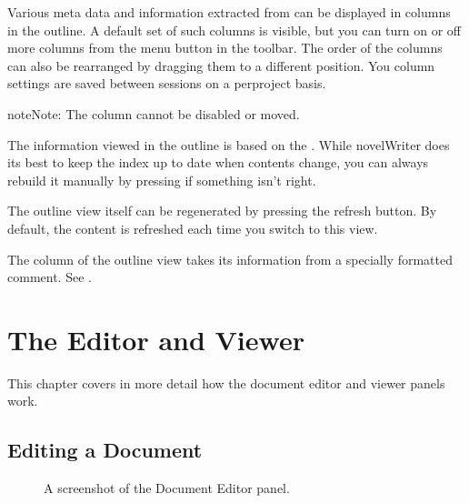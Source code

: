 \documentclass[a4paper,11pt,english]{sphinxmanual}
\begin{document}
\sphinxAtStartPar
Various meta data and information extracted from {\hyperref[\detokenize{int_glossary:term-Tag}]{}} can be displayed in columns in
the outline. A default set of such columns is visible, but you can turn on or off more columns from
the menu button in the toolbar. The order of the columns can also be rearranged by dragging them to
a different position. You column settings are saved between sessions on a per\sphinxhyphen{}project basis.

\begin{sphinxadmonition}{note}{Note:}
\sphinxAtStartPar
The  column cannot be disabled or moved.
\end{sphinxadmonition}

\sphinxAtStartPar
The information viewed in the outline is based on the {\hyperref[\detokenize{int_glossary:term-Project-Index}]{}}. While novelWriter does
its best to keep the index up to date when contents change, you can always rebuild it manually by
pressing  if something isn’t right.

\sphinxAtStartPar
The outline view itself can be regenerated by pressing the refresh button. By default, the content
is refreshed each time you switch to this view.

\sphinxAtStartPar
The  column of the outline view takes its information from a specially formatted
comment. See {\hyperref[\detokenize{usage_format:a-fmt-comm}]{}}.

\sphinxstepscope


\chapter{The Editor and Viewer}
\label{\detokenize{usage_writing:the-editor-and-viewer}}\label{\detokenize{usage_writing:a-ui-writing}}\label{\detokenize{usage_writing::doc}}
\sphinxAtStartPar
This chapter covers in more detail how the document editor and viewer panels work.


\section{Editing a Document}
\label{\detokenize{usage_writing:editing-a-document}}\label{\detokenize{usage_writing:a-ui-edit}}
\begin{figure}[htbp]
\centering
\capstart

\noindent{}
\caption{A screenshot of the Document Editor panel.}\label{\detokenize{usage_writing:id1}}\end{figure}
\end{document}
